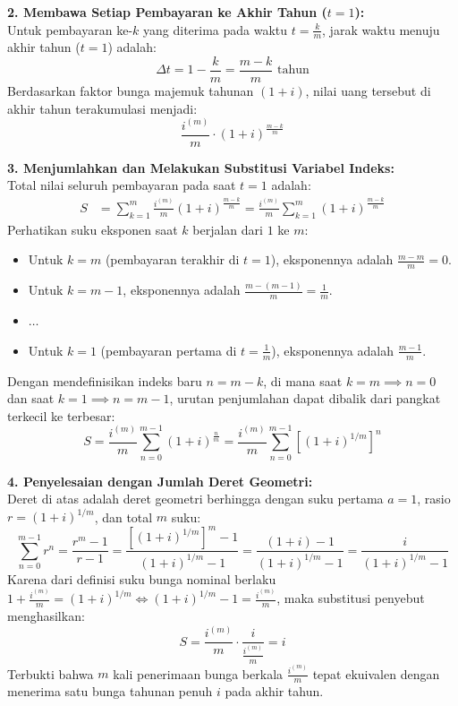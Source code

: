 \documentclass[11pt,a4paper]{article}
\begin{document}
\begin{notebox}
\textbf{2. Membawa Setiap Pembayaran ke Akhir Tahun ($t = 1$):}\\
Untuk pembayaran ke-$k$ yang diterima pada waktu $t = \frac{k}{m}$, jarak waktu menuju akhir tahun ($t=1$) adalah:
\begin{equation*}
    \Delta t = 1 - \frac{k}{m} = \frac{m - k}{m} \text{ tahun}
\end{equation*}
Berdasarkan faktor bunga majemuk tahunan $(1+i)$, nilai uang tersebut di akhir tahun terakumulasi menjadi:
\begin{equation*}
    \frac{i^{(m)}}{m} \cdot (1+i)^{\frac{m-k}{m}}
\end{equation*}

\textbf{3. Menjumlahkan dan Melakukan Substitusi Variabel Indeks:}\\
Total nilai seluruh pembayaran pada saat $t=1$ adalah:
\begin{align*}
    S &= \sum_{k=1}^m \frac{i^{(m)}}{m} (1+i)^{\frac{m-k}{m}} = \frac{i^{(m)}}{m} \sum_{k=1}^m (1+i)^{\frac{m-k}{m}}
\end{align*}
Perhatikan suku eksponen saat $k$ berjalan dari $1$ ke $m$:
\begin{itemize}
    \item Untuk $k = m$ (pembayaran terakhir di $t=1$), eksponennya adalah $\frac{m-m}{m} = 0$.
    \item Untuk $k = m-1$, eksponennya adalah $\frac{m-(m-1)}{m} = \frac{1}{m}$.
    \item $\dots$
    \item Untuk $k = 1$ (pembayaran pertama di $t=\frac{1}{m}$), eksponennya adalah $\frac{m-1}{m}$.
\end{itemize}
Dengan mendefinisikan indeks baru $n = m - k$, di mana saat $k=m \implies n=0$ dan saat $k=1 \implies n=m-1$, urutan penjumlahan dapat dibalik dari pangkat terkecil ke terbesar:
\begin{equation}
    S = \frac{i^{(m)}}{m} \sum_{n=0}^{m-1} (1+i)^{\frac{n}{m}} = \frac{i^{(m)}}{m} \sum_{n=0}^{m-1} \left[(1+i)^{1/m}\right]^n
\end{equation}

\textbf{4. Penyelesaian dengan Jumlah Deret Geometri:}\\
Deret di atas adalah deret geometri berhingga dengan suku pertama $a=1$, rasio $r = (1+i)^{1/m}$, dan total $m$ suku:
\begin{equation*}
    \sum_{n=0}^{m-1} r^n = \frac{r^m - 1}{r - 1} = \frac{\left[(1+i)^{1/m}\right]^m - 1}{(1+i)^{1/m} - 1} = \frac{(1+i) - 1}{(1+i)^{1/m} - 1} = \frac{i}{(1+i)^{1/m} - 1}
\end{equation*}
Karena dari definisi suku bunga nominal berlaku $1 + \frac{i^{(m)}}{m} = (1+i)^{1/m} \iff (1+i)^{1/m} - 1 = \frac{i^{(m)}}{m}$, maka substitusi penyebut menghasilkan:
\begin{equation}
    S = \frac{i^{(m)}}{m} \cdot \frac{i}{\frac{i^{(m)}}{m}} = i
\end{equation}
Terbukti bahwa $m$ kali penerimaan bunga berkala $\frac{i^{(m)}}{m}$ tepat ekuivalen dengan menerima satu bunga tahunan penuh $i$ pada akhir tahun.
\end{notebox}
\end{document}
